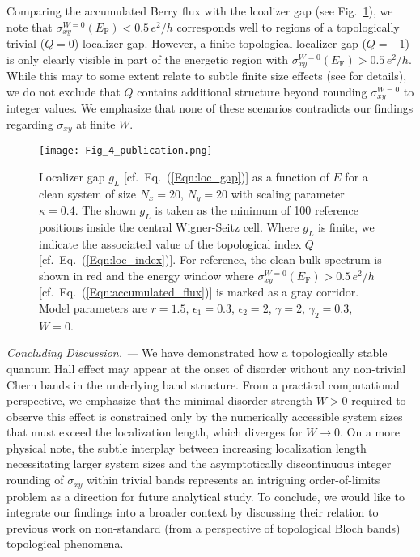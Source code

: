 \documentclass[aps,prl,amsmath,amssymb,twocolumn, superscriptaddress]{revtex4-2}
\newcommand{\BM}[1]{{\color{orange} #1}}
\newcommand{\eq}[1]{Eq.~(\ref{#1})}
\begin{document}
Comparing the accumulated Berry flux with the lcoalizer gap (see Fig.~\ref{Fig:spec_loc}), we note that $\sigma_{xy}^{W=0}(E_\mathrm{F})<0.5\, e^2 / h$ corresponds well to regions of a topologically trivial ($Q=0$) localizer gap. However, a finite topological localizer gap ($Q= -1$) is only clearly visible in part of the energetic region with $\sigma_{xy}^{W=0}(E_\mathrm{F}) > 0.5\, e^2 / h$. While this may to some extent relate to subtle finite size effects (see \cite{Supplemental} for details), we do not exclude that $Q$ contains additional structure beyond rounding $\sigma_{xy}^{W=0}$ to integer values. We emphasize that none of these scenarios contradicts our findings regarding $\sigma_{xy}$ at finite $W$.  

\begin{figure}[htp!]	 
{\texttt{[image: Fig\_4\_publication.png]}}
\caption{Localizer gap $g_L$ [cf.~\eq{Eqn:loc_gap}] as a function of $E$ \BM{for} a clean system of size $N_x = 20$, $N_y = 20$ with scaling parameter $\kappa = 0.4$. The shown $g_L$ is taken as the minimum of 100 reference positions inside the central Wigner-Seitz cell. Where $g_L$ is finite, we indicate the associated value of the topological index $Q$ [cf.~\eq{Eqn:loc_index}]. For reference, the clean bulk spectrum is shown in red and the energy window where $\sigma_{xy}^{W=0}(E_\mathrm{F})  > 0.5 \,e^2 / h$ [cf.~\eq{Eqn:accumulated_flux}] is marked as a gray corridor. Model parameters are $r = 1.5$, $\epsilon_1 = 0.3$, $\epsilon_2 = 2$, $\gamma  =2$, $\gamma_2 = 0.3$, $W = 0$.}\label{Fig:spec_loc}
\end{figure}

{\it Concluding Discussion. ---} 
We have demonstrated how a topologically stable quantum Hall effect may appear at the onset of disorder without any non-trivial Chern bands in the underlying band structure. From a practical computational perspective, we emphasize that the minimal disorder strength $W > 0$ required to observe this effect is constrained only by the numerically accessible system sizes that must exceed the localization length, which diverges for $W \rightarrow 0$. On a more physical note, the subtle interplay between increasing localization length necessitating larger system sizes and the asymptotically discontinuous integer rounding of $\sigma_{xy}$ within trivial bands represents an intriguing order-of-limits problem as a direction for future analytical study. To conclude, we would like to integrate our findings into a broader context by discussing their relation to previous work on non-standard (from a perspective of topological Bloch bands) topological phenomena.
\end{document}
